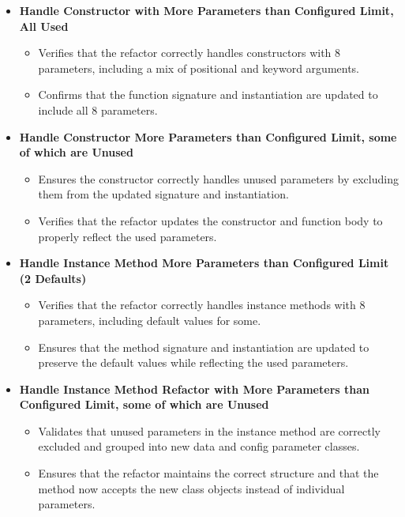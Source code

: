 \documentclass[12pt, titlepage]{article}
\begin{document}
\begin{itemize}
    \item \textbf{Handle Constructor with More Parameters than Configured Limit, All Used}
    \begin{itemize}
        \item Verifies that the refactor correctly handles constructors with 8 parameters, including a mix of positional and keyword arguments.
        \item Confirms that the function signature and instantiation are updated to include all 8 parameters.
    \end{itemize}

    \item \textbf{Handle Constructor More Parameters than Configured Limit, some of which are Unused}
    \begin{itemize}
        \item Ensures the constructor correctly handles unused parameters by excluding them from the updated signature and instantiation.
        \item Verifies that the refactor updates the constructor and function body to properly reflect the used parameters.
    \end{itemize}

    \item \textbf{Handle Instance Method More Parameters than Configured Limit (2 Defaults)}
    \begin{itemize}
        \item Verifies that the refactor correctly handles instance methods with 8 parameters, including default values for some.
        \item Ensures that the method signature and instantiation are updated to preserve the default values while reflecting the used parameters.
    \end{itemize}

    \item \textbf{Handle Instance Method Refactor with More Parameters than Configured Limit, some of which are Unused}
    \begin{itemize}
        \item Validates that unused parameters in the instance method are correctly excluded and grouped into new data and config parameter classes.
        \item Ensures that the refactor maintains the correct structure and that the method now accepts the new class objects instead of individual parameters.
    \end{itemize}


\end{itemize}
\end{document}
